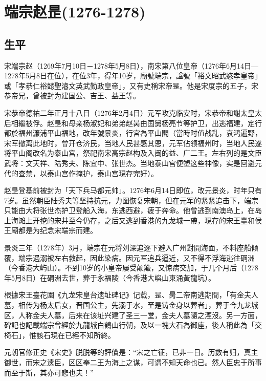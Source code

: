 
\section{端宗赵昰\tiny(1276-1278)}

\subsection{生平}

宋端宗赵（1269年7月10日－1278年5月8日），南宋第八位皇帝（1276年6月14日—1278年5月8日在位），在位3年，得年10岁，廟號端宗，諡號「裕文昭武愍孝皇帝」或「孝恭仁裕懿聖濬文英武勤政皇帝」，又有史稱宋帝昰。他是宋度宗的五子，宋恭帝兄，曾被封为建国公、吉王、益王等。

宋恭帝德祐二年正月十八日（1276年2月4日）元军攻克临安时，宋恭帝和謝太皇太后相繼被俘。赵昰和母亲杨淑妃和弟弟赵昺由国舅杨亮节等护卫，出逃福建，定行都於福州濂浦平山福地，改年號景炎，行宮為平山閣（當時时值战乱，哀鸿遍野，宋军撤离此地时，曾开仓济民，当地人民甚感其恩，元军佔领福州时，当地人民遂将平山阁改名为泰山宫，祭祀南宋高宗赵构及入闽的益、广二王。左右列的是文臣武将：文天祥、陆秀夫、陈宜中、张世杰。当地泰山宫便塑这些神像，实是回避元代的查禁，以泰山宫作掩护，泰山宫現存完好）。

赵昰登基前被封为「天下兵马都元帅」。1276年6月14日即位，改元景炎，时年只有7岁。虽然朝臣陆秀夫等坚持抗元，力图恢复宋朝，但在元军的紧紧追击下，端宗只能由大将张世杰护卫登船入海，东逃西避，疲于奔命。他曾逃到南澳岛上，在岛上海滩上开挖的宋井至今仍存，之后又逃到香港的九龙城一帶，現存的宋王臺和侯王廟都是为纪念宋端宗而建。

景炎三年（1278年）3月，端宗在元将刘深追逐下避入广州對開海面，不料座船倾覆，端宗遇溺被左右救起，因此染病。因元军追兵逼近，又不得不浮海逃往碙洲（今香港大屿山）。不到10岁的小皇帝屡受颠簸，又惊病交加，于几个月后（1278年5月8日）在碙洲去世，葬于永福陵（今香港大嶼山東涌黃龍坑）。

根據宋王臺花園《九龙宋皇台遗址碑记》记载，昰、昺二帝南逃期間，「有金夫人墓，相传为杨太后女，晋国公主，先溺于水，至是铸金身以葬者」，葬于今九龙城区，人称金夫人墓，后来在该址兴建了圣三一堂，金夫人墓隨之湮沒。另一方面，碑記也記載端宗曾經於九龍城白鶴山行朝，及以一塊大石為御座，後人稱此為「交椅石」，惟該石現在已經不知所終。

元朝官修正史《宋史》脱脱等的評價是：“宋之亡征，已非一日。历数有归，真主御世，而宋之遗臣，区区奉二王为海上之谋，可谓不知天命也已。然人臣忠于所事而至于斯，其亦可悲也夫！”


